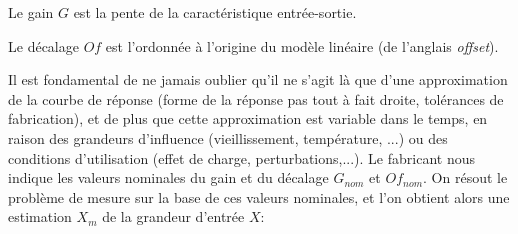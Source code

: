 \begin{definition}
    Le gain $G$ est la pente de la caractéristique entrée-sortie.
\end{definition}

\begin{definition}
    Le décalage $Of$ est l'ordonnée à l'origine du modèle linéaire (de l'anglais \emph{offset}).
\end{definition}

Il est fondamental de ne jamais oublier qu'il ne s'agit là que d'une approximation de la courbe de réponse (forme de la réponse pas tout à fait droite, tolérances de fabrication), et de plus que cette approximation est variable dans le temps, en raison des grandeurs d'influence (vieillissement, température, ...) ou des conditions d'utilisation (effet de charge, perturbations,...). Le fabricant nous indique les valeurs nominales du gain et du décalage $G_{nom}$ et $Of_{nom}$.
On résout le problème de mesure sur la base de ces valeurs nominales, et l'on obtient alors une estimation $X_{m}$ de la grandeur d'entrée $X$:

\begin{center}
\end{center}

